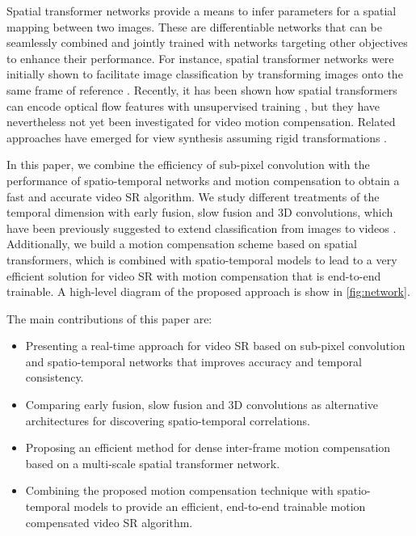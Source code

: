 \documentclass[10pt,twocolumn,letterpaper]{article}
\begin{document}
Spatial transformer networks \cite{Jaderberg2015} provide a means to infer parameters for a spatial mapping between two images. These are differentiable networks that can be seamlessly combined and jointly trained with networks targeting other objectives to enhance their performance. For instance, spatial transformer networks were initially shown to facilitate image classification by transforming images onto the same frame of reference \cite{Jaderberg2015}. Recently, it has been shown how spatial transformers can encode optical flow features with unsupervised training \cite{Ganin2016, Ahmadi2016, Patraucean2016a, Handa2016}, but they have nevertheless not yet been investigated for video motion compensation. Related approaches have emerged for view synthesis assuming rigid transformations \cite{Kalantari2016}.



In this paper, we combine the efficiency of sub-pixel convolution with the performance of spatio-temporal networks and motion compensation to obtain a fast and accurate video \gls{SR} algorithm. We study different treatments of the temporal dimension with early fusion, slow fusion and 3D convolutions, which have been previously suggested to extend classification from images to videos \cite{Karpathy2014a, Tran2015}. Additionally, we build a motion compensation scheme based on spatial transformers, which is combined with spatio-temporal models to lead to a very efficient solution for video \gls{SR} with motion compensation that is end-to-end trainable. A high-level diagram of the proposed approach is show in \cref{fig:network}.

The main contributions of this paper are:





\begin{itemize}
\item Presenting a real-time approach for video \gls{SR} based on sub-pixel convolution and spatio-temporal networks that improves accuracy and temporal consistency.

\item Comparing early fusion, slow fusion and 3D convolutions as alternative architectures for discovering spatio-temporal correlations.

\item Proposing an efficient method for dense inter-frame motion compensation based on a multi-scale spatial transformer network.

\item Combining the proposed motion compensation technique with spatio-temporal models to provide an efficient, end-to-end trainable motion compensated video \gls{SR} algorithm.
\end{itemize}
\end{document}
